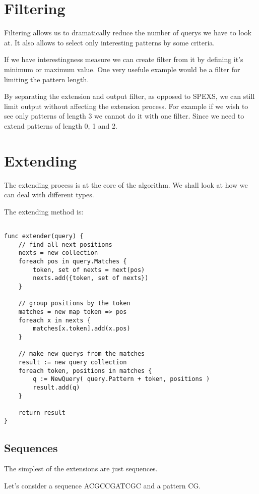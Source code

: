 \section{Filtering}

Filtering allows us to dramatically reduce the number of querys
we have to look at. It also allows to select only interesting patterns by
some criteria.

If we have interestingness measure we can create filter from it by
defining it's minimum or maximum value. One very usefule example 
would be a filter for limiting the pattern length.

By separating the extension and output filter, as opposed to SPEXS, 
we can still limit output without affecting the extension process.
For example if we wish to see only patterns of length 3 we cannot do
it with one filter. Since we need to extend patterns of length 0, 1 and 2.

\section{Extending}

The extending process is at the core of the algorithm. 
We shall look at how we can deal with different types.

The extending method is:

\begin{verbatim}

func extender(query) {
	// find all next positions
	nexts = new collection
	foreach pos in query.Matches {
		token, set of nexts = next(pos)
		nexts.add({token, set of nexts})
	}

	// group positions by the token
	matches = new map token => pos
	foreach x in nexts {
		matches[x.token].add(x.pos)
	}

	// make new querys from the matches
	result := new query collection
	foreach token, positions in matches {
		q := NewQuery( query.Pattern + token, positions )
		result.add(q)
	}

	return result
}

\end{verbatim}

\subsection{Sequences}

The simplest of the extensions are just sequences.

Let's consider a sequence ACGCCGATCGC and a pattern CG.

